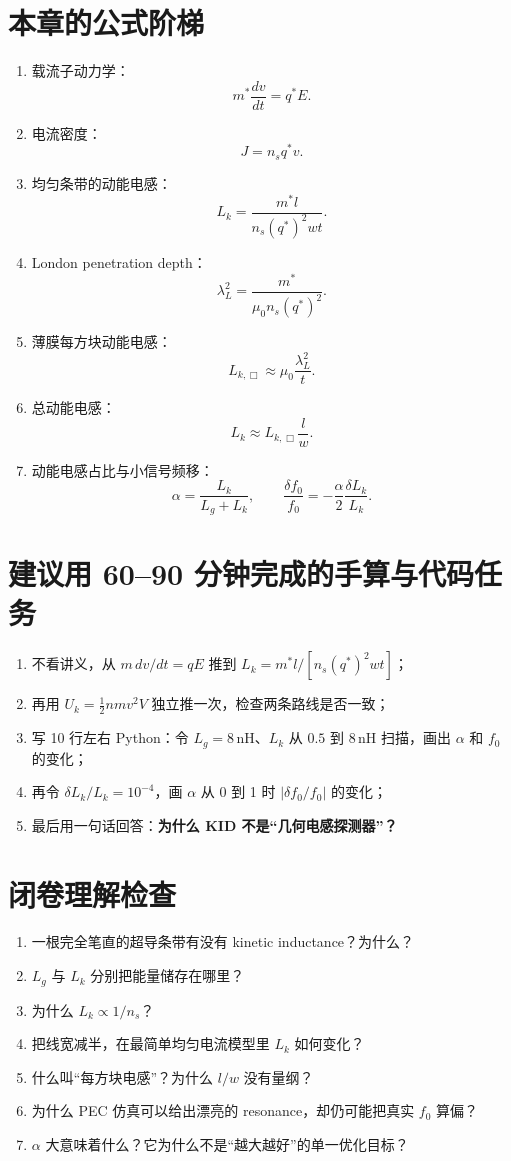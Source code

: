 \documentclass[11pt,a4paper,openany]{ctexrep}
\begin{document}
\section{本章的公式阶梯}
\begin{enumerate}
  \item 载流子动力学：
  \[
  m^*\frac{dv}{dt}=q^*E.
  \]
  \item 电流密度：
  \[
  J=n_sq^*v.
  \]
  \item 均匀条带的动能电感：
  \[
  \boxed{L_k=\frac{m^*l}{n_s(q^*)^2wt}}.
  \]
  \item London penetration depth：
  \[
  \boxed{\lambda_L^2=\frac{m^*}{\mu_0n_s(q^*)^2}}.
  \]
  \item 薄膜每方块动能电感：
  \[
  \boxed{L_{k,\Box}\approx\mu_0\frac{\lambda_L^2}{t}}.
  \]
  \item 总动能电感：
  \[
  L_k\approx L_{k,\Box}\frac{l}{w}.
  \]
  \item 动能电感占比与小信号频移：
  \[
  \boxed{\alpha=\frac{L_k}{L_g+L_k}},\qquad
  \boxed{\frac{\delta f_0}{f_0}=-\frac{\alpha}{2}\frac{\delta L_k}{L_k}}.
  \]
\end{enumerate}

\section{建议用 60--90 分钟完成的手算与代码任务}
\begin{enumerate}
  \item 不看讲义，从 $m\,dv/dt=qE$ 推到 $L_k=m^*l/[n_s(q^*)^2wt]$；
  \item 再用 $U_k=\tfrac12nmv^2V$ 独立推一次，检查两条路线是否一致；
  \item 写 10 行左右 Python：令 $L_g=8\,\mathrm{nH}$、$L_k$ 从 $0.5$ 到 $8\,\mathrm{nH}$ 扫描，画出 $\alpha$ 和 $f_0$ 的变化；
  \item 再令 $\delta L_k/L_k=10^{-4}$，画 $\alpha$ 从 0 到 1 时 $|\delta f_0/f_0|$ 的变化；
  \item 最后用一句话回答：\textbf{为什么 KID 不是“几何电感探测器”？}
\end{enumerate}

\section{闭卷理解检查}
\begin{checkpointbox}
\begin{enumerate}
  \item 一根完全笔直的超导条带有没有 kinetic inductance？为什么？
  \item $L_g$ 与 $L_k$ 分别把能量储存在哪里？
  \item 为什么 $L_k\propto1/n_s$？
  \item 把线宽减半，在最简单均匀电流模型里 $L_k$ 如何变化？
  \item 什么叫“每方块电感”？为什么 $l/w$ 没有量纲？
  \item 为什么 PEC 仿真可以给出漂亮的 resonance，却仍可能把真实 $f_0$ 算偏？
  \item $\alpha$ 大意味着什么？它为什么不是“越大越好”的单一优化目标？
\end{enumerate}
\end{checkpointbox}
\end{document}
